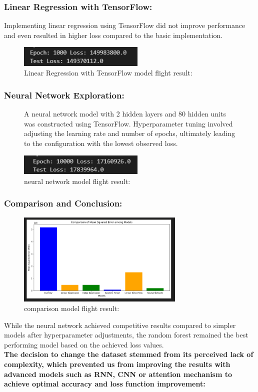 \documentclass{article}
\begin{document}
\subsubsection{Linear Regression with TensorFlow: }Implementing linear regression using TensorFlow did not improve performance and even resulted in higher loss compared to the basic implementation.
\begin{figure}[H]
    \caption{Linear Regression with TensorFlow model flight result:}
    \centering
    \includegraphics[width=6cm]{../imgFolder/linearRegressionTensorflowFlight.png}
\end{figure}

\subsubsection{Neural Network Exploration:}

\begin{figure}[H]
    A neural network model with 2 hidden layers and 80 hidden units was constructed using TensorFlow. Hyperparameter tuning involved adjusting the learning rate and number of epochs, ultimately leading to the configuration with the lowest observed loss.
    \caption{neural network model flight result:}
    \centering
    \includegraphics[width=6cm]{../imgFolder/neuronNetworkFlight.png}
\end{figure}

\subsubsection{Comparison and Conclusion:}
\begin{figure}[H]
    \caption{comparison model flight result:}
    \centering
    \includegraphics[width=8cm]{../imgFolder/comparisonFlight.png}
\end{figure}
While the neural network achieved competitive results compared to simpler models after hyperparameter adjustments, the random forest remained the best performing model based on the achieved loss values.\\\newline
\textbf{The decision to change the dataset stemmed from its perceived lack of complexity, which prevented us from improving the results with advanced models such as RNN, CNN or attention mechanism to achieve optimal accuracy and loss function improvement:}
\newpage
\end{document}
